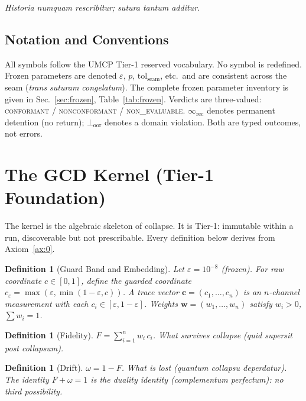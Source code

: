 \documentclass[
  aps,
  prd,
  preprint,
  superscriptaddress,
  nofootinbib,
  floatfix,
  longbibliography
]{revtex4-2}
\newtheorem{definition}[theorem]{Definition}
\newcommand{\eps}{\varepsilon}
\newcommand{\tolseam}{\mathrm{tol}_{\mathrm{seam}}}
\newcommand{\regime}[1]{\textrm{\upshape\scshape#1}}
\newcommand{\conform}{\regime{conformant}}
\newcommand{\nonconform}{\regime{nonconformant}}
\newcommand{\tvec}{\mathbf{c}}
\newcommand{\wvec}{\mathbf{w}}
\newcommand{\Fid}{F}
\newcommand{\Drft}{\omega}
\newcommand{\lat}[1]{\textit{#1}}
\begin{document}
\lat{Historia numquam rescribitur; sutura tantum additur.}

\subsection{Notation and Conventions}

All symbols follow the UMCP Tier-1 reserved vocabulary.
No symbol is redefined.
Frozen parameters are denoted $\eps$, $p$, $\tolseam$, etc.\
and are consistent across the seam
(\lat{trans suturam congelatum}).
The complete frozen parameter inventory is given
in Sec.~\ref{sec:frozen}, Table~\ref{tab:frozen}.
Verdicts are three-valued: \conform{} / \nonconform{} /
\regime{non\_evaluable}.
$\infty_{\mathrm{rec}}$ denotes permanent detention
(no return); $\bot_{\mathrm{oor}}$ denotes a domain violation.
Both are typed outcomes, not errors.

\section{The GCD Kernel (Tier-1 Foundation)}\label{sec:kernel}

The kernel is the algebraic skeleton of collapse.
It is Tier-1: immutable within a run, discoverable but
not prescribable. Every definition below derives from
Axiom~\ref{ax:0}.

\begin{definition}[Guard Band and Embedding]\label{def:guard}
Let $\eps = 10^{-8}$ (frozen). For raw coordinate $c \in [0,1]$,
define the guarded coordinate $c_{\eps} = \max(\eps, \min(1-\eps, c))$.
A trace vector $\tvec = (c_1, \ldots, c_n)$ is
an $n$-channel measurement with each $c_i \in [\eps, 1-\eps]$.
Weights $\wvec = (w_1, \ldots, w_n)$ satisfy
$w_i > 0$, $\sum w_i = 1$.
\end{definition}

\begin{definition}[Fidelity]\label{def:F}
$\Fid = \sum_{i=1}^{n} w_i\, c_i$. \quad
What survives collapse (\lat{quid supersit post collapsum}).
\end{definition}

\begin{definition}[Drift]\label{def:omega}
$\Drft = 1 - \Fid$. \quad
What is lost (\lat{quantum collapsu deperdatur}).
The identity $\Fid + \Drft = 1$ is the
\emph{duality identity} (\lat{complementum perfectum}):
no third possibility.
\end{definition}
\end{document}

